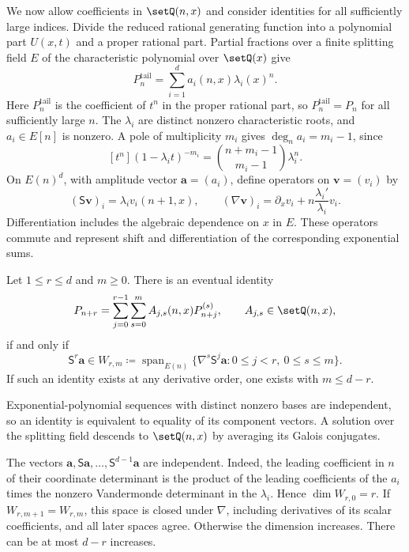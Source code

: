 We now allow coefficients in $\setQ(n,x)$ and consider identities for all
sufficiently large indices. Divide the reduced rational generating function
into a polynomial part $U(x,t)$ and a proper rational part. Partial fractions
over a finite splitting field $E$ of the characteristic polynomial over
$\setQ(x)$ give
\[
 P_n^{\mathrm{tail}}=\sum_{i=1}^d a_i(n,x)\lambda_i(x)^n.
\]
Here $P_n^{\mathrm{tail}}$ is the coefficient of $t^n$ in the proper rational
part, so $P_n^{\mathrm{tail}}=P_n$ for all sufficiently large $n$.
The $\lambda_i$ are distinct nonzero characteristic roots, and
$a_i\in E[n]$ is nonzero. A pole of multiplicity $m_i$ gives
$\deg_n a_i=m_i-1$, since
\[
 [t^n](1-\lambda_i t)^{-m_i}
 =\binom{n+m_i-1}{m_i-1}\lambda_i^n.
\]
On $E(n)^d$, with amplitude vector $\mathbf{a}=(a_i)$, define operators
on $\mathbf{v}=(v_i)$ by
\[
 (\mathsf S\mathbf{v})_i=\lambda_i v_i(n+1,x),\qquad
 (\nabla\mathbf{v})_i=\partial_xv_i+n\frac{\lambda_i'}{\lambda_i}v_i.
\]
Differentiation includes the algebraic dependence on $x$ in $E$.
These operators commute and represent shift and differentiation of the
corresponding exponential sums.

\begin{theorem}
\label{recurrenceRankCriterion}
Let $1\leq r\leq d$ and $m\geq0$. There is an eventual identity
\[
 P_{n+r}=\sum_{j=0}^{r-1}\sum_{s=0}^{m}A_{j,s}(n,x)P_{n+j}^{(s)},
 \qquad A_{j,s}\in\setQ(n,x),
\]
if and only if
\[
 \mathsf S^r\mathbf{a}\in
 W_{r,m}\coloneqq\operatorname{span}_{E(n)}
 \{\nabla^s\mathsf S^j\mathbf{a}:0\leq j<r,\ 0\leq s\leq m\}.
\]
If such an identity exists at any derivative order, one exists with
$m\leq d-r$.
\end{theorem}

\begin{proof*}
Exponential-polynomial sequences with distinct nonzero bases are independent,
so an identity is equivalent to equality of its component vectors.
A solution over the splitting field descends to $\setQ(n,x)$ by averaging
its Galois conjugates.

The vectors
$\mathbf{a},\mathsf S\mathbf{a},\dotsc,\mathsf S^{d-1}\mathbf{a}$ are independent.
Indeed, the leading coefficient in $n$ of their coordinate determinant is
the product of the leading coefficients of the $a_i$ times the nonzero
Vandermonde determinant in the $\lambda_i$. Hence $\dim W_{r,0}=r$.
If $W_{r,m+1}=W_{r,m}$, this space is closed under $\nabla$, including
derivatives of its scalar coefficients, and all later spaces agree.
Otherwise the dimension increases. There can be at most $d-r$ increases.
\end{proof*}

